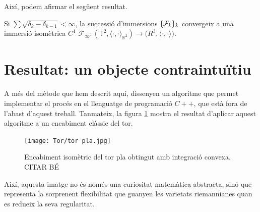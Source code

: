 Així, podem afirmar el següent resultat.
\begin{teo}
    Si $\sum\sqrt{\delta_k-\delta_{k-1}}<\infty$, la successió d'immersions $\{\mathcal F_k\}_k$ convergeix a una immersió isomètrica $C^1$ $\mathcal F_\infty:(\mathbb T^2, \langle\cdot, \cdot\rangle_{\mathbb R^2})\to\mathbb (R^3, \langle\cdot, \cdot\rangle)$.
\end{teo}

\section{Resultat: un objecte contraintuïtiu}
A més del mètode que hem descrit aquí, \cite{borrelli2013} dissenyen un algoritme que permet implementar el procés en el llenguatge de programació $C++$, que està fora de l'abast d'aquest treball. Tanmateix, la figura \ref{fig:tor_pl} mostra el resultat d'aplicar aquest algoritme a un encabiment clàssic del tor.
\begin{figure}[h!]
    \centering
    \texttt{[image: Tor/tor pla.jpg]}
    \caption{Encabiment isomètric del tor pla obtingut amb integració convexa.{\color{blue} CITAR BÉ}}
    \label{fig:tor_pl} 
\end{figure}

Així, aquesta imatge no és només una curiositat matemàtica abstracta, sinó que representa la sorprenent flexibilitat que guanyen les varietats riemannianes quan es redueix la seva regularitat.
